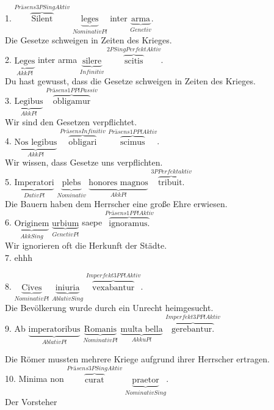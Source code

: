 \documentclass[a4paper]{article}
\newcommand{\ann}[2]{$\underbrace{\text{#1}}_{#2}$}
\newcommand{\ovv}[2]{$\overbrace{\text{#1}}^{#2}$}
\begin{document}
1. \ovv{Silent}{Präsens 3P Sing Aktiv} \ann{leges}{Nominativ Pl} inter \ann{arma}{Genetiv}. \\

Die Gesetze schweigen in Zeiten des Krieges. \\

2. \ann{Leges}{Akk Pl} inter arma \ann{silere}{Infinitiv} \ovv{scitis}{2P Sing Perfekt Aktiv}. \\

Du hast gewusst, dass die Gesetze schweigen in Zeiten des Krieges. \\

3. \ann{Legibus}{Akk Pl} \ovv{obligamur}{Präsens 1P Pl Passiv} \\

Wir sind den Gesetzen verpflichtet. \\

4. \ann{Nos legibus}{Akk Pl} \ovv{obligari}{Präsens Infinitiv} \ovv{scimus}{Präsens 1P Pl Aktiv}. \\

Wir wissen, dass Gesetze uns verpflichten. \\

5. \ann{Imperatori}{Dativ Pl} \ann{plebs}{Nominativ} \ann{honores magnos}{Akk Pl} \ovv{tribuit.}{3P Perfekt aktiv} \\

Die Bauern haben dem Herrscher eine große Ehre erwiesen. \\

6. \ann{Originem}{Akk Sing} \ann{urbium}{Genetiv Pl} saepe \ovv{ignoramus.}{Präsens 1P Pl Aktiv} \\

Wir ignorieren oft die Herkunft der Städte. \\

7. ehhh

8. \ann{Cives}{Nominativ Pl} \ann{iniuria}{Ablativ Sing} \ovv{vexabantur}{Imperfekt 3P Pl Aktiv}. \\

Die Bevölkerung wurde durch ein Unrecht heimgesucht. \\

9. Ab \ann{imperatoribus}{Ablativ Pl} \ann{Romanis}{Nominativ Pl} \ann{multa bella}{Akku Pl} \ovv{gerebantur.}{Imperfekt 3P Pl Aktiv} \

Die Römer mussten mehrere Kriege aufgrund ihrer Herrscher ertragen. \\

10. Minima non \ovv{curat}{Präsens 3P Sing Aktiv} \ann{praetor}{Nominativ Sing}. \\

Der Vorsteher
\end{document}
